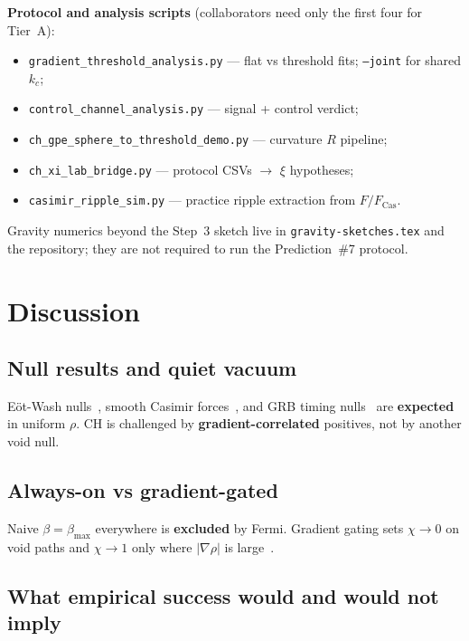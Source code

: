 \documentclass[11pt,a4paper]{article}
\newcommand{\py}[1]{\nolinkurl{#1}}
\begin{document}
\textbf{Protocol and analysis scripts} (collaborators need only the first four for Tier~A):
\begin{itemize}[leftmargin=*]
  \item \py{gradient_threshold_analysis.py} --- flat vs threshold fits; \texttt{--joint} for shared $k_c$;
  \item \py{control_channel_analysis.py} --- signal + control verdict;
  \item \py{ch_gpe_sphere_to_threshold_demo.py} --- curvature $R$ pipeline;
  \item \py{ch_xi_lab_bridge.py} --- protocol CSVs $\to$ $\xi$ hypotheses;
  \item \py{casimir_ripple_sim.py} --- practice ripple extraction from $F/F_{\mathrm{Cas}}$.
\end{itemize}
Gravity numerics beyond the Step~3 sketch live in \texttt{gravity-sketches.tex} and the repository; they are not required to run the Prediction~\#7 protocol.


\section{Discussion}
\label{sec:discussion}

\subsection{Null results and quiet vacuum}

E\"ot-Wash nulls~\cite{Lee2020}, smooth Casimir forces~\cite{Casimir1948}, and GRB timing nulls~\cite{Abdo2009Nature,AmelinoCamelia2009} are \textbf{expected} in uniform $\rho$.
CH is challenged by \textbf{gradient-correlated} positives, not by another void null.

\subsection{Always-on vs gradient-gated}

Naive $\beta = \beta_{\max}$ everywhere is \textbf{excluded} by Fermi.
Gradient gating sets $\chi \to 0$ on void paths and $\chi \to 1$ only where $|\nabla\rho|$ is large~\cite{Volovik2003,Unruh1981}.

\subsection{What empirical success would and would not imply}
\label{sec:implications}
\end{document}

